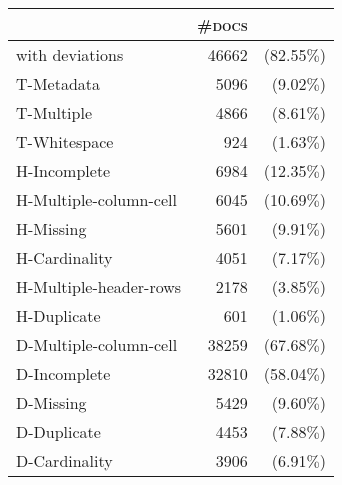 \begin{tabular}{lrr} 
 \toprule 
 & \textsc{\#docs} & \\ 
 \midrule 
with deviations&46662 &(82.55$\%$)\\ 
  \bottomrule 
T-Metadata&5096 &(9.02$\%$)\\ 
  T-Multiple&4866 &(8.61$\%$)\\ 
  T-Whitespace&924 &(1.63$\%$)\\ 
  \bottomrule 
H-Incomplete&6984 &(12.35$\%$)\\ 
  H-Multiple-column-cell&6045 &(10.69$\%$)\\ 
  H-Missing&5601 &(9.91$\%$)\\ 
  H-Cardinality&4051 &(7.17$\%$)\\ 
  H-Multiple-header-rows&2178 &(3.85$\%$)\\ 
  H-Duplicate&601 &(1.06$\%$)\\ 
  \bottomrule 
D-Multiple-column-cell&38259 &(67.68$\%$)\\ 
  D-Incomplete&32810 &(58.04$\%$)\\ 
  D-Missing&5429 &(9.60$\%$)\\ 
  D-Duplicate&4453 &(7.88$\%$)\\ 
  D-Cardinality&3906 &(6.91$\%$)\\ 
  \bottomrule 
 \end{tabular}